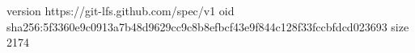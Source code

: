 version https://git-lfs.github.com/spec/v1
oid sha256:5f3360e9c0913a7b48d9629cc9c8b8efbcf43e9f844c128f33fccbfdcd023693
size 2174
